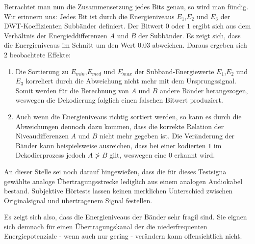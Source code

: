 Betrachtet man nun die Zusammensetzung jedes Bits genau, so wird man fündig. Wir erinnern uns: Jedes Bit ist durch die Energieniveaus ${E}_{1}$,${E}_{2}$ und ${E}_{3}$ der DWT-Koeffizienten Subbänder definiert. Der Bitwert $0$ oder $1$ ergibt sich aus dem Verhältnis der Energieddifferenzen $A$ und $B$ der Subbänder. Es zeigt sich, dass die Energieniveaus im Schnitt um den Wert $0.03$ abweichen. Daraus ergeben sich 2 beobachtete Effekte:

\begin{enumerate}
		
\item Die Sortierung zu ${E}_{min}$,${E}_{med}$ und ${E}_{max}$ der Subband-Energiewerte ${E}_{1}$,${E}_{2}$ und ${E}_{3}$ korreliert durch die Abweichung nicht mehr mit dem Ursprungssignal. Somit werden für die Berechnung von $A$ und $B$ andere Bänder herangezogen, weswegen die Dekodierung folglich einen falschen Bitwert produziert. 
	
\item Auch wenn die Energieniveaus richtig sortiert werden, so kann es durch die Abweichungen dennoch dazu kommen, dass die korrekte Relation der Niveaudifferenzen $A$ und $B$ nicht mehr gegeben ist. Die Veränderung der Bänder kann beispielsweise ausreichen, dass bei einer kodierten $1$ im Dekodierprozess jedoch $A \ngtr B$ gilt, weswegen eine $0$ erkannt wird.
	
\end{enumerate}

An dieser Stelle sei noch darauf hingewießen, dass die für dieses Testsigna gewählte analoge Übertragungsstrecke lediglich aus einem analogen Audiokabel bestand. Subjektive Hörtests lassen keinen merklichen Unterschied zwischen Originalsignal und übertragenem Signal festellen. 

Es zeigt sich also, dass die Energieniveaus der Bänder sehr fragil sind. Sie eignen sich demnach für einen Übertragungskanal der die niederfrequenten Energiepotenziale - wenn auch nur gering - verändern kann offensichtlich nicht. 